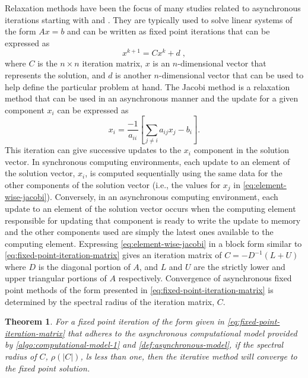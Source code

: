 \documentclass{article}
\newtheorem{theorem}{Theorem}
\theoremstyle{definition}
\theoremstyle{example}
\theoremstyle{example}
\theoremstyle{example}
\begin{document}
Relaxation methods have been the focus of many studies related to asynchronous iterations starting with \cite{chazan1969chaotic} and \cite{baudet1978asynchronous}. They are typically used to solve linear systems of the form $Ax = b$ and can be written as fixed point iterations that can be expressed as
\begin{equation}
\label{eq:fixed-point-iteration-matrix}
x^{k+1} = C x^k + d\; ,
\end{equation}
\noindent
where $C$ is the $n\times n$ iteration matrix, $x$ is an $n$-dimensional vector that represents the solution, and $d$ is another $n$-dimensional vector that can be used to help define the particular problem at hand. The Jacobi method is a relaxation method that can be used in an asynchronous manner and the update for a given component $x_i$ can be expressed as
\begin{equation}
\label{eq:element-wise-jacobi}
x_i = \frac{-1}{a_{ii}}\left[\sum_{j\neq i} a_{ij}x_j - b_i \right].
\end{equation}
\noindent
This iteration can give successive updates to the $x_i$ component in the solution vector. In synchronous computing environments, each update to an element of the solution vector, $x_i$, is computed sequentially using the same data for the other components of the solution vector (i.e., the values for $x_j$ in \cref{eq:element-wise-jacobi}). Conversely, in an asynchronous computing environment, each update to an element of the solution vector occurs when the computing element responsible for updating that component is ready to write the update to memory and the other components used are simply the latest ones available to the computing element. Expressing \cref{eq:element-wise-jacobi} in a block form similar to \cref{eq:fixed-point-iteration-matrix} gives an iteration matrix of $C = -D^{-1}(L+U)$ where $D$ is the diagonal portion of $A$, and $L$ and $U$ are the strictly lower and upper triangular portions of $A$ respectively. Convergence of asynchronous fixed point methods of the form presented in \cref{eq:fixed-point-iteration-matrix} is determined by the spectral radius of the iteration matrix, $C$. 

\begin{theorem}
	\label{th:fixed-point-convergence}
	For a fixed point iteration of the form given in \cref{eq:fixed-point-iteration-matrix} that adheres to the	asynchronous computational model provided by \cref{algo:computational-model-1} and \cref{def:asynchronous-model}, if the spectral radius of $C$, $\rho(|C|)$, ls less than one, then the iterative method will converge to the fixed point solution.
\end{theorem}
\end{document}
